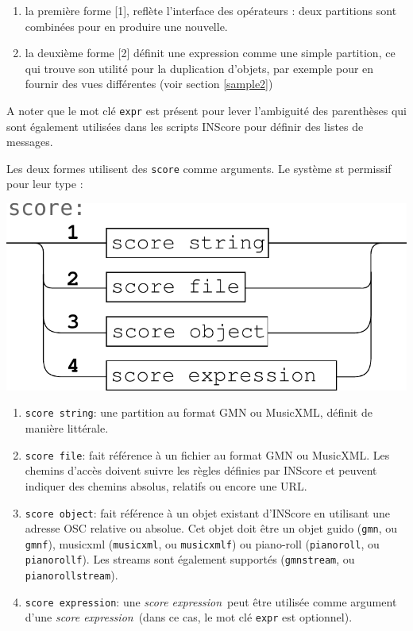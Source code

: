 \documentclass{article}
\newcommand{\OSC}[1]{\texttt{#1}}
\newcommand{\sExpr}{\emph{score expression}}
\begin{document}
\begin{enumerate}
\item la première forme [1], reflète l'interface des opérateurs : deux partitions sont combinées pour en produire une nouvelle.
\item la deuxième forme [2] définit une expression comme une simple partition, ce qui trouve son utilité pour la duplication d'objets, par exemple pour en fournir des vues différentes (voir section \ref{sample2})
\end{enumerate}

A noter que le mot clé \OSC{expr} est présent pour lever l'ambiguité des parenthèses qui sont également utilisées dans les scripts INScore pour définir des listes de messages.

Les deux formes utilisent des \OSC{score} comme arguments. Le système st permissif pour leur type :
\begin{center}
\includegraphics[width=0.7\columnwidth]{imgs/syntax2}
\end{center}

\begin{enumerate}
\item \OSC{score string}: une partition au format GMN ou MusicXML, définit de manière littérale.
\item \OSC{score file}:  fait référence à un fichier au format GMN ou MusicXML. Les chemins d'accès doivent suivre les règles définies par INScore et peuvent indiquer des chemins absolus, relatifs ou encore une URL.
\item \OSC{score object}:  fait référence à un objet existant d'INScore en utilisant une adresse OSC relative ou absolue. Cet objet doit être un objet guido (\OSC{gmn}, ou \OSC{gmnf}), musicxml (\OSC{musicxml}, ou \OSC{musicxmlf}) ou piano-roll (\OSC{pianoroll}, ou \OSC{pianorollf}). Les streams sont également supportés (\OSC{gmnstream}, ou \OSC{pianorollstream}).
\item \OSC{score expression}:  une \sExpr\ peut être utilisée comme argument d'une \sExpr\ (dans ce cas, le mot clé \OSC{expr} est optionnel).
\end{enumerate}
\end{document}

